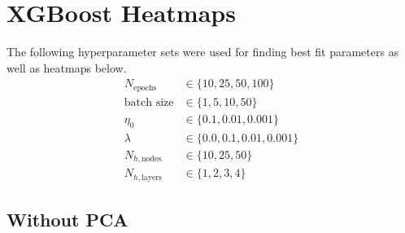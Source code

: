 \documentclass[a4paper]{article}
\newcommand{\Nhn}{N_{h,\text{nodes}}}
\newcommand{\Nhl}{N_{h,\text{layers}}}
\begin{document}

\section{XGBoost Heatmaps} \label{app:xgboost_heatmaps}
The following hyperparameter sets were used for finding best fit parameters as well as heatmaps below.
\begin{align*}
	N_{\text{epochs}} &\in \{10, 25, 50, 100\}\\
	\text{batch size} &\in \{1, 5, 10, 50\}\\
	\eta_0 &\in \{0.1, 0.01, 0.001\}\\
	\lambda &\in \{0.0, 0.1, 0.01, 0.001\}\\
	\Nhn &\in \{10, 25, 50\}\\
	\Nhl &\in \{1, 2, 3, 4\}
\end{align*}

\subsection{Without PCA}
\end{document}
